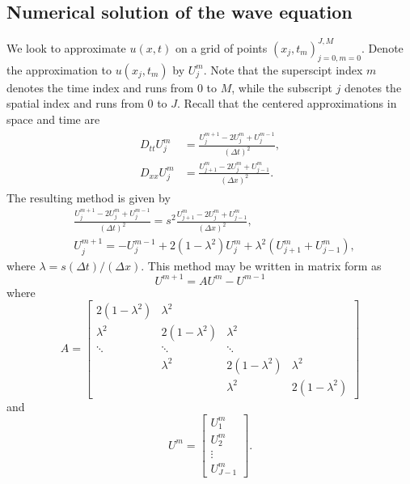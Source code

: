 \subsection*{Numerical solution of the wave equation}
We look to approximate $u(x,t)$ on a grid of points $(x_j,t_m)_{j=0,m=0}^{J,M}$.
Denote the approximation to $u(x_j,t_m)$ by $U_{j}^{m}$.
Note that the superscipt index $m$ denotes the time index and runs from $0$ to $M$, while the subscript $j$ denotes the spatial index and runs from $0$ to $J$.
Recall that the centered approximations in space and time are
\begin{align}
	\begin{split}
		D_{tt} U_{j}^{m} &= \frac{U_{j}^{m+1} -2 U_{j}^{m} + U_{j}^{m-1}}{(\Delta t)^2} ,\\
		D_{xx} U_{j}^{m} &= \frac{U_{j+1}^{m} -2 U_{j}^{m} + U_{j-1}^{m}}{(\Delta x)^2} .
		\label{waveeqn:eqn:2nd-order-centered-2nd-derivative}
	\end{split}
\end{align}
The resulting method is given by
\begin{align*}
	&\frac{U_{j}^{m+1} -2 U_{j}^{m} + U_{j}^{m-1}}{(\Delta t)^2} = s^2 \frac{U_{j+1}^{m} -2 U_{j}^{m} + U_{j-1}^{m}}{(\Delta x)^2}, \\
	&U_{j}^{m+1} =  - U_{j}^{m-1} + 2 (1-\lambda^2) U_{j}^{m} + \lambda ^2 (U_{j+1}^{m} + U_{j-1}^{m}),
\end{align*}
where $ \lambda  =  s(\Delta t)/(\Delta x)$.
This method may be written in matrix form as
\begin{equation}
U^{m+1} = AU^{m} - U^{m-1} 
\label{waveeqn:eqn:matrix-form}
\end{equation}
where
\begin{equation*}
A =
\left[\begin{array}{cccc}2(1-\lambda^2) & \lambda^2 &  &  \\ \lambda^2 & 2(1-\lambda^2) & \lambda^2 &  \\ \ddots & \ddots & \ddots &  \\ & \lambda^2 & 2(1-\lambda^2) & \lambda^2 \\  &  & \lambda^2 & 2(1-\lambda^2)\end{array}\right]
\end{equation*}
and
\begin{equation*}
    U^m = \left[\begin{array}{c}U_{1}^{m} \\U_{2}^{m} \\\vdots \\U_{J-1}^{m}\end{array}\right].
\end{equation*}


